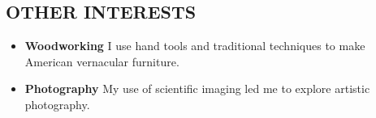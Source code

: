 \documentclass{res}
\begin{document}
\begin{resume}
 \section{OTHER INTERESTS}
   \begin{itemize}
     \item \textbf{Woodworking}	I use hand tools and traditional techniques to make American vernacular furniture.
     \item \textbf{Photography}	My use of scientific imaging led me to explore artistic photography.
   \end{itemize}


\end{resume}
\end{document}
